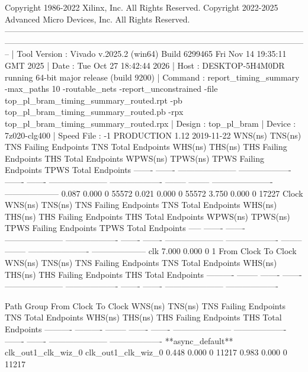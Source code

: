 \begin{codeblock}
Copyright 1986-2022 Xilinx, Inc. All Rights Reserved. Copyright 2022-2025 Advanced Micro Devices, Inc. All Rights Reserved.
--------------------------------------------------------------------------------------------------------------------------------------------------------------------------------------------------------------------------
| Tool Version : Vivado v.2025.2 (win64) Build 6299465 Fri Nov 14 19:35:11 GMT 2025
| Date         : Tue Oct 27 18:42:44 2026
| Host         : DESKTOP-5H4M0DR running 64-bit major release  (build 9200)
| Command      : report_timing_summary -max_paths 10 -routable_nets -report_unconstrained -file top_pl_bram_timing_summary_routed.rpt -pb top_pl_bram_timing_summary_routed.pb -rpx top_pl_bram_timing_summary_routed.rpx
| Design       : top_pl_bram
| Device       : 7z020-clg400
| Speed File   : -1  PRODUCTION 1.12 2019-11-22
    WNS(ns)      TNS(ns)  TNS Failing Endpoints  TNS Total Endpoints      WHS(ns)      THS(ns)  THS Failing Endpoints  THS Total Endpoints     WPWS(ns)     TPWS(ns)  TPWS Failing Endpoints  TPWS Total Endpoints  
    -------      -------  ---------------------  -------------------      -------      -------  ---------------------  -------------------     --------     --------  ----------------------  --------------------  
      0.087        0.000                      0                55572        0.021        0.000                      0                55572        3.750        0.000                       0                 17227  
Clock                     WNS(ns)      TNS(ns)  TNS Failing Endpoints  TNS Total Endpoints      WHS(ns)      THS(ns)  THS Failing Endpoints  THS Total Endpoints     WPWS(ns)     TPWS(ns)  TPWS Failing Endpoints  TPWS Total Endpoints  
-----                     -------      -------  ---------------------  -------------------      -------      -------  ---------------------  -------------------     --------     --------  ----------------------  --------------------  
clk                                                                                                                                                                     7.000        0.000                       0                     1  
From Clock    To Clock          WNS(ns)      TNS(ns)  TNS Failing Endpoints  TNS Total Endpoints      WHS(ns)      THS(ns)  THS Failing Endpoints  THS Total Endpoints  
----------    --------          -------      -------  ---------------------  -------------------      -------      -------  ---------------------  -------------------  

Path Group          From Clock          To Clock                WNS(ns)      TNS(ns)  TNS Failing Endpoints  TNS Total Endpoints      WHS(ns)      THS(ns)  THS Failing Endpoints  THS Total Endpoints  
----------          ----------          --------                -------      -------  ---------------------  -------------------      -------      -------  ---------------------  -------------------  
**async_default**   clk_out1_clk_wiz_0  clk_out1_clk_wiz_0        0.448        0.000                      0                11217        0.983        0.000                      0                11217
\end{codeblock}

